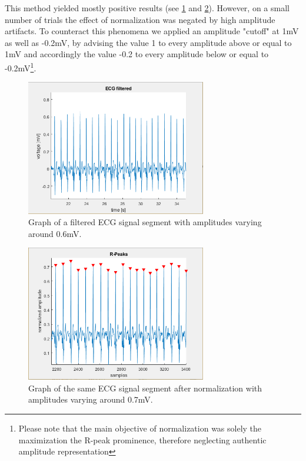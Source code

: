 This method yielded mostly positive results (see \ref{ecgfiltImg} and \ref{ecgnormImg}). However, on a small number of trials the effect of normalization was negated by high amplitude artifacts. To counteract this phenomena we applied an amplitude "cutoff" at 1mV as well as -0.2mV, by advising the value 1 to every amplitude above or equal to 1mV and accordingly the value -0.2 to every amplitude below or equal to -0.2mV\footnote{Please note that the main objective of normalization was solely the maximization the R-peak prominence, therefore neglecting authentic amplitude representation}.

\newpage
\begin{figure}[H]
\centering
\includegraphics[width=0.7\textwidth]{images/ecgfiltered.png}
\caption{Graph of a filtered ECG signal segment with amplitudes varying around 0.6mV. }
\label{ecgfiltImg}
\end{figure}

\begin{figure}[H]
\centering
\includegraphics[width=0.7\textwidth]{images/ecgnorm.png}
\caption{Graph of the same ECG signal segment after normalization with amplitudes varying around 0.7mV. }
\label{ecgnormImg}
\end{figure}

